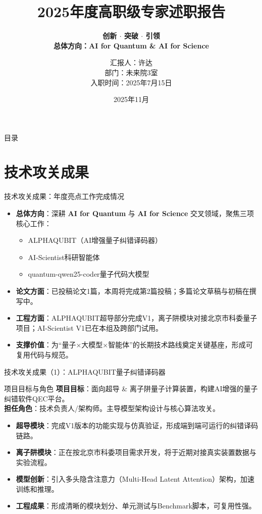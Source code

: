 \documentclass[aspectratio=169]{beamer} %
\title[2025年度述职报告]{2025年度高职级专家述职报告}
\subtitle{\textbf{创新 $\cdot$ 突破 $\cdot$ 引领} \\ \vspace{0.2cm} \large \textbf{总体方向：AI for Quantum \& AI for Science}} %
\author[许达]{汇报人：许达  \\ 部门：未来院3室 \\入职时间：2025年7月15日}
\date{2025年11月}
\institute[研究院]{中国移动研究院}
\begin{document}
\begin{frame}[plain]
    \titlepage
\end{frame}

\begin{frame}{目录}
    \tableofcontents
\end{frame}

\section{技术攻关成果}
\begin{frame}{技术攻关成果：年度亮点工作完成情况}
    \begin{itemize}
        \item \textbf{总体方向}：深耕 \textbf{AI for Quantum} 与 \textbf{AI for Science} 交叉领域，聚焦三项核心工作：
        \begin{itemize}
            \item ALPHAQUBIT（AI增强量子纠错译码器）
            \item AI-Scientist科研智能体
            \item quantum-qwen25-coder量子代码大模型
        \end{itemize}
        \item \textbf{论文方面}：已投稿论文1篇，本周将完成第2篇投稿；多篇论文草稿与初稿在撰写中。
        \item \textbf{工程方面}：ALPHAQUBIT超导部分完成V1，离子阱模块对接北京市科委量子项目；AI-Scientist V1已在本组及跨部门试用。
        \item \textbf{支撑价值}：为“量子×大模型×智能体”的长期技术路线奠定关键基座，形成可复用代码与规范。
    \end{itemize}
\end{frame}

\begin{frame}{技术攻关成果（1）：ALPHAQUBIT量子纠错译码器}
    \begin{block}{项目目标与角色}
        \textbf{项目目标}：面向超导 \& 离子阱量子计算装置，构建AI增强的量子纠错软件QEC平台。\\
        \textbf{担任角色}：技术负责人/架构师。主导模型架构设计与核心算法攻关。
    \end{block}
    \begin{itemize}
        \item \textbf{超导模块}：完成V1版本的功能实现与仿真验证，形成端到端可运行的纠错译码链路。
        \item \textbf{离子阱模块}：正在按北京市科委项目需求开发，将于近期对接真实装置数据与实验流程。
        \item \textbf{模型创新}：引入多头隐含注意力（Multi-Head Latent Attention）架构，加速训练和推理。
        \item \textbf{工程成果}：形成清晰的模块划分、单元测试与Benchmark脚本，可复用性强。
    \end{itemize}
\end{frame}
\end{document}
